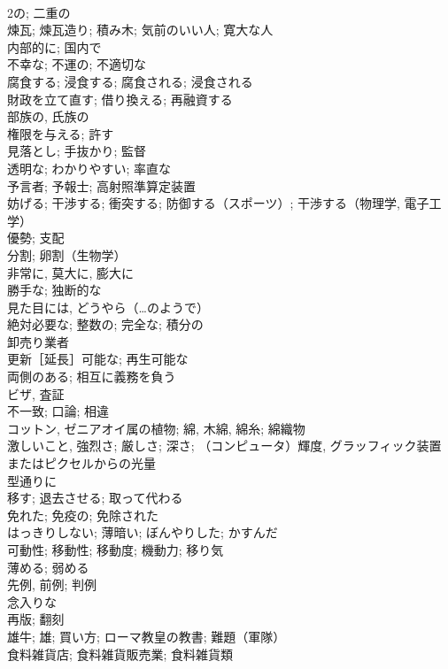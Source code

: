 \documentclass[8pt]{extreport}
\begin{document}
\begin{CJK}{UTF8}{min}
\\	2の; 二重の	
\\	煉瓦; 煉瓦造り; 積み木; 気前のいい人; 寛大な人	
\\	内部的に; 国内で	
\\	不幸な; 不運の; 不適切な	
\\	腐食する; 浸食する; 腐食される; 浸食される	
\\	財政を立て直す; 借り換える; 再融資する	
\\	部族の, 氏族の	
\\	権限を与える; 許す	
\\	見落とし; 手抜かり; 監督	
\\	透明な; わかりやすい; 率直な	
\\	予言者; 予報士; 高射照準算定装置	
\\	妨げる; 干渉する; 衝突する; 防御する（スポーツ）; 干渉する（物理学, 電子工学）	
\\	優勢; 支配	
\\	分割; 卵割（生物学）	
\\	非常に, 莫大に, 膨大に	
\\	勝手な; 独断的な	
\\	見た目には, どうやら（…のようで）	
\\	絶対必要な; 整数の; 完全な; 積分の	
\\	卸売り業者	
\\	更新［延長］可能な; 再生可能な	
\\	両側のある; 相互に義務を負う	
\\	ビザ, 査証	
\\	不一致; 口論; 相違	
\\	コットン, ゼニアオイ属の植物; 綿, 木綿, 綿糸; 綿織物	
\\	激しいこと, 強烈さ; 厳しさ; 深さ; （コンピュータ）輝度, グラッフィック装置またはピクセルからの光量	
\\	型通りに	
\\	移す; 退去させる; 取って代わる	
\\	免れた; 免疫の; 免除された	
\\	はっきりしない; 薄暗い; ぼんやりした; かすんだ	
\\	可動性; 移動性; 移動度; 機動力; 移り気	
\\	薄める; 弱める	
\\	先例, 前例; 判例	
\\	念入りな	
\\	再版; 翻刻	
\\	雄牛; 雄; 買い方; ローマ教皇の教書; 難題（軍隊）	
\\	食料雑貨店; 食料雑貨販売業; 食料雑貨類	

\end{CJK}
\end{document}
